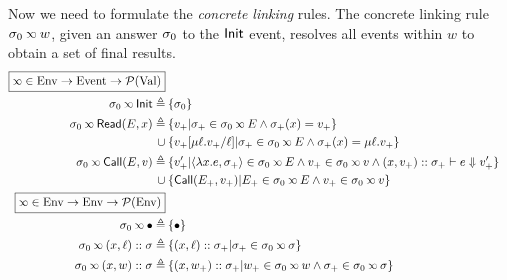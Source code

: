 \documentclass{article}
\begin{document}
Now we need to formulate the \emph{concrete linking} rules.
The concrete linking rule $\ctx_0\semlink w$, given an answer $\sigma_0$ to the $\textsf{Init}$ event, resolves all events within $w$ to obtain a set of final results.
\begin{align*}
	\fbox{$\semlink\in\Ctx\rightarrow\Event\rightarrow\pset(\Value)$}                                                                                                                                  \\
	\ctx_0\semlink\InitE\triangleq                         & \: \{\ctx_0\}                                                                                                                             \\
	\ctx_0\semlink\ReadE(\event,x)\triangleq               & \: \{v_+|\ctx_+\in\ctx_0\semlink\event\land\ctx_+(x)=v_+\}                                                                                \\
	\cup                                                   & \: \{v_+[\mu\ell.v_+/\ell]|\ctx_+\in\ctx_0\semlink E\land\ctx_+(x)=\mu\ell.v_+\}                                                          \\
	\ctx_0\semlink\CallE(\event,v)\triangleq               & \: \{v_+'|\langle\lambda x.e,\ctx_+\rangle\in\ctx_0\semlink E\land v_+\in\ctx_0\semlink v\land(x,v_+)\cons\ctx_+\vdash e\Downarrow v_+'\} \\
	\cup                                                   & \: \{\CallE(\event_+,v_+)|\event_+\in\ctx_0\semlink E\land v_+\in\ctx_0\semlink v\}                                                       \\
	\fbox{$\semlink\in\Ctx\rightarrow\Ctx\rightarrow\pset(\Ctx)$}                                                                                                                                      \\
	\ctx_0\semlink\bullet\triangleq                        & \: \{\bullet\}                                                                                                                            \\
	\ctx_0\semlink(x,\ell)\cons\ctx\triangleq              & \: \{(x,\ell)\cons\ctx_+|\ctx_+\in\ctx_0\semlink\ctx\}                                                                                    \\
	\ctx_0\semlink(x,w)\cons\ctx\triangleq                 & \: \{(x,w_+)\cons\ctx_+|w_+\in\ctx_0\semlink w\land\ctx_+\in\ctx_0\semlink\ctx\}                                                          \\

\end{align*}
\end{document}
